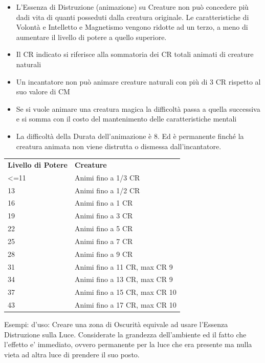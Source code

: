 \documentclass[a4paper,10 pt,twoside,openany]{book}
\begin{document}
\begin{itemize}
	\item
	L'Essenza di Distruzione (animazione) su Creature non può concedere più dadi vita di quanti posseduti dalla creatura originale. Le caratteristiche di Volontà e Intelletto e Magnetismo vengono ridotte ad un terzo, a meno di aumentare il livello di potere a quello superiore.
	\item
	Il CR indicato si riferisce alla sommatoria dei CR totali animati di creature naturali
	\item
	Un incantatore non può animare creature naturali con più di 3 CR rispetto al suo valore di CM
	\item
	Se si vuole animare una creatura magica la difficoltà passa a quella successiva e si somma con il costo del mantenimento delle caratteristiche mentali
	\item
	La difficoltà della Durata dell'animazione è 8. Ed è permanente finché la creatura animata non viene distrutta o dismessa dall'incantatore.
\end{itemize}

\bigskip

\begin{tabularx}{0.95\textwidth}{lX}
	\toprule
	\textbf{Livello di Potere} & \textbf{Creature}\\
	\textless=11               & Animi fino a 1/3 CR\\
	13                         & Animi fino a 1/2 CR\\
	16                         & Animi fino a 1 CR\\
	19                         & Animi fino a 3 CR\\
	22                         & Animi fino a 5 CR\\
	25                         & Animi fino a 7 CR\\
	28                         & Animi fino a 9 CR\\
	31                         & Animi fino a 11 CR, max CR 9\\
	34                         & Animi fino a 13 CR, max CR 9\\
	37                         & Animi fino a 15 CR, max CR 10\\
	43                         & Animi fino a 17 CR, max CR 10\\
\end{tabularx}

\bigskip

Esempi: d'uso:
Creare una zona di Oscurità equivale ad usare l'Essenza Distruzione sulla Luce. Considerate la grandezza dell'ambiente ed il fatto che l'effetto e' immediato, ovvero permanente per la luce che era presente ma nulla vieta ad altra luce di prendere il suo posto.
\pagebreak
\end{document}
